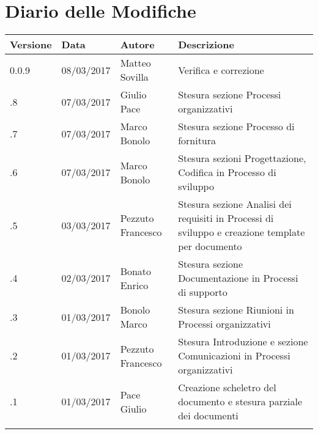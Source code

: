 \section*{Diario delle Modifiche}
\begin{longtabu} to \textwidth {
	X[4,l,p]
	X[4,l,p]
	X[4,l,p]
	X[8,l,p]}
	\toprule
		 Versione & Data & Autore & Descrizione \\
		\midrule
		\endhead
		
		0.0.9 & 08/03/2017 & Matteo Sovilla & Verifica e correzione\\
		\addlinespace[0.2em]
		\midrule
		.8 & 07/03/2017 & Giulio Pace & Stesura sezione Processi organizzativi\\
		\addlinespace[0.2em]
		\midrule
		.7 & 07/03/2017 & Marco Bonolo & Stesura sezione Processo di fornitura\\
		\addlinespace[0.2em]
		\midrule
		.6 & 07/03/2017 & Marco Bonolo & Stesura sezioni Progettazione, Codifica in Processo di sviluppo\\
		\addlinespace[0.2em]
		\midrule
		.5 & 03/03/2017 & Pezzuto Francesco & Stesura sezione Analisi dei requisiti in Processi di sviluppo e creazione template per documento\\
		\addlinespace[0.2em]
		\midrule
		.4 & 02/03/2017 & Bonato Enrico & Stesura sezione Documentazione in Processi di supporto\\
		\addlinespace[0.2em]
		\midrule
		.3 & 01/03/2017 & Bonolo Marco & Stesura sezione Riunioni in Processi organizzativi\\
		\addlinespace[0.2em]
		\midrule
		.2 & 01/03/2017 & Pezzuto Francesco & Stesura Introduzione e sezione Comunicazioni in Processi organizzativi\\
		\addlinespace[0.2em]
		\midrule
		.1 & 01/03/2017 & Pace Giulio & Creazione scheletro del documento e stesura parziale dei documenti\\
		\addlinespace[0.4em]
		
	\bottomrule
\end{longtabu}
